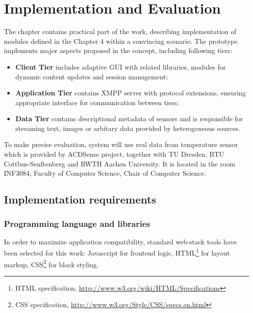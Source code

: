 \chapter{Implementation and Evaluation}
	The chapter contains practical part of the work, describing implementation of modules defined in the Chapter 4 within a convincing scenario. The prototype implements major aspects proposed in the concept, including following tiers:
	 \begin{itemize}
		\item \textbf{Client Tier} includes adaptive GUI with related libraries, modules for dynamic content updates and session management;
		\item \textbf{Application Tier} contains XMPP server with protocol extensions, ensuring appropriate interface for communication between tiers;
		\item \textbf{Data Tier} contains descriptional metadata of sensors and is responsible for streaming text, images or arbitary data provided by heterogeneous sources.
	\end{itemize}
	To make precise evaluation, system will use real data from temperature sensor which is provided by ACDSense project, together with TU Dresden, BTU Cottbus-Senftenberg and RWTH Aachen University. It is located in the room INF3084, Faculty of Computer Science, Chair of Computer Science.


\section{Implementation requirements}
\subsection{Programming language and libraries}
In order to maximize application compatibility, standard web-stack tools have been selected for this work: Javascript for frontend logic, HTML\footnote{HTML specification, \url{http://www.w3.org/wiki/HTML/Specifications}} for layout markup, CSS\footnote{CSS specification, \url{http://www.w3.org/Style/CSS/specs.en.html}} for block styling.

